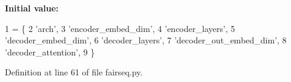 {\bfseries Initial value\+:}
\begin{DoxyCode}
1 =  \{
2     \textcolor{stringliteral}{'arch'},
3     \textcolor{stringliteral}{'encoder\_embed\_dim'},
4     \textcolor{stringliteral}{'encoder\_layers'},
5     \textcolor{stringliteral}{'decoder\_embed\_dim'},
6     \textcolor{stringliteral}{'decoder\_layers'},
7     \textcolor{stringliteral}{'decoder\_out\_embed\_dim'},
8     \textcolor{stringliteral}{'decoder\_attention'},
9 \}
\end{DoxyCode}


Definition at line 61 of file fairseq.\+py.

